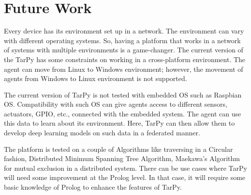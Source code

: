 \chapter{Future Work}

\bigbreak
Every device has its environment set up in a network. The environment can vary with different operating systems. So, having a platform that works in a network of systems with multiple environments is a game-changer. The current version of the TarPy has some constraints on working in a cross-platform environment. The agent can move from Linux to Windows environment; however, the movement of agents from Windows to Linux environment is not supported.\par

\bigbreak
The current version of TarPy is not tested with embedded OS such as Raspbian OS. Compatibility with such OS can give agents access to different sensors, actuators, GPIO, etc., connected with the embedded system. The agent can use this data to learn about its environment. Here, TarPy can then allow them to develop deep learning models on such data in a federated manner.\par


\bigbreak
The platform is tested on a couple of Algorithms like traversing in a Circular fashion, Distributed Minimum Spanning Tree Algorithm, Maekawa's Algorithm for mutual exclusion in a distributed system. There can be use cases where TarPy will need some improvement at the Prolog level. In that case, it will require some basic knowledge of Prolog to enhance the features of TarPy.\par
